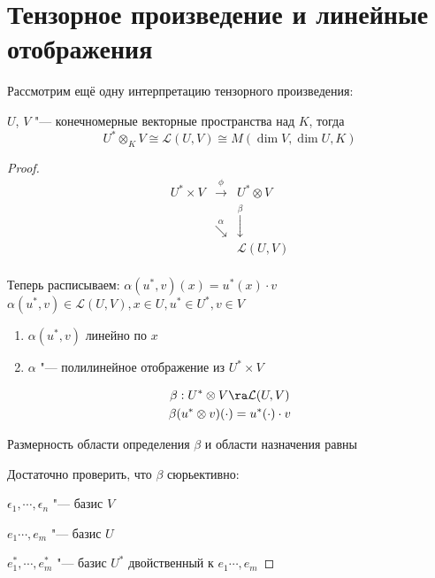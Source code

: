 \section{Тензорное произведение и линейные отображения}
Рассмотрим ещё одну интерпретацию тензорного произведения:

\begin{theorem}
    $U$, $V$ "--- конечномерные векторные пространства над $K$, тогда
	\[ U^* \otimes_{K} V \cong \mathcal{L}(U, V) \cong M(\dim V, \dim U, K) \]
\end{theorem}
\begin{proof}
    $$
    \begin{matrix}
    U^* \times V  & \overset{\phi}{\rightarrow}& U^* \otimes V\\
    &\overset{\alpha}{\searrow}&\overset{\beta}{\downarrow}\\
    &&\mathcal{L}(U, V)\\
    \end{matrix}
    $$

    Теперь расписываем: $\alpha(u^*, v)(x) = u^*(x)\cdot v$\\
    $\alpha(u^*, v) \in \mathcal{L}{(U,V)}, x \in U, u^* \in U^*, v \in V$\\
    \begin{enumerate}
        \item $\alpha(u^*, v)$  линейно по $x$
        \item $\alpha$ "--- полилинейное отображение из $U^* \times V$
    \end{enumerate}

    \begin{gather*}
        \beta: U^* \otimes V \ra \mathcal{L}(U, V) \\
        \beta (u^* \otimes v)(\cdot) = u^*(\cdot)\cdot v
    \end{gather*}

    Размерность области определения $\beta$ и области назначения равны

    Достаточно проверить, что $\beta$ сюрьективно:

    $\epsilon_1, \cdots, \epsilon_n$ "--- базис $V$

    $e_1 \cdots, e_m$ "--- базис $U$

    $e_1^*, \cdots, e_m^*$ "--- базис $U^*$ двойственный к $e_1 \cdots, e_m$


\end{proof}
